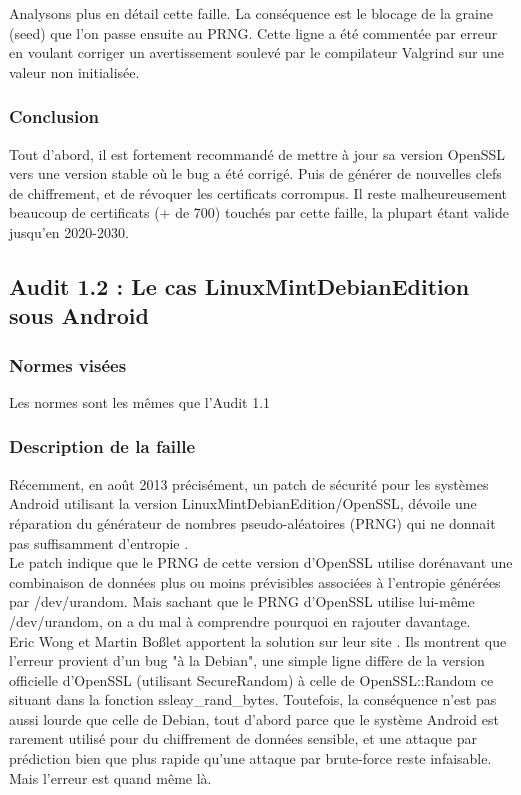 			Analysons plus en détail cette faille. La conséquence est le blocage de la graine (seed) que l'on passe ensuite au PRNG. Cette ligne a été commentée par erreur en voulant corriger un avertissement soulevé par le compilateur Valgrind sur une valeur non initialisée.

		\subsubsection{Conclusion}
		
			Tout d'abord, il est fortement recommandé de mettre à jour sa version OpenSSL vers une version stable où le bug a été corrigé. Puis de générer de nouvelles clefs de chiffrement, et de révoquer les certificats corrompus. Il reste malheureusement beaucoup de certificats (+ de 700) touchés par cette faille, la plupart étant valide jusqu'en 2020-2030.
			
	\subsection{Audit 1.2 : Le cas LinuxMintDebianEdition sous Android}
		\subsubsection{Normes visées}
	
			Les normes sont les mêmes que l'Audit 1.1
		
		\subsubsection{Description de la faille}
		
			Récemment, en août 2013 précisément, un patch de sécurité pour les systèmes Android utilisant la version LinuxMintDebianEdition/OpenSSL, dévoile une réparation du générateur de nombres pseudo-aléatoires (PRNG) qui ne donnait pas suffisamment d'entropie \cite{alex2013android} \cite{bochum2013randomly}. \\ 

			Le patch indique que le PRNG de cette version d'OpenSSL utilise dorénavant une combinaison de données plus ou moins prévisibles associées à l'entropie générées par /dev/urandom. Mais sachant que le PRNG d'OpenSSL utilise lui-même /dev/urandom, on a du mal à comprendre pourquoi en rajouter davantage.\\
		
			Eric Wong et Martin Boßlet apportent la solution sur leur site \cite{boblet2013android}. Ils montrent que l'erreur provient d'un bug "à la Debian", une simple ligne diffère de la version officielle d'OpenSSL (utilisant SecureRandom) à celle de OpenSSL::Random ce situant dans la fonction ssleay\_rand\_bytes. Toutefois, la conséquence n'est pas aussi lourde que celle de Debian, tout d'abord parce que le système Android est rarement utilisé pour du chiffrement de données sensible, et une attaque par prédiction bien que plus rapide qu'une attaque par brute-force reste infaisable. Mais l'erreur est quand même là. \\
	
